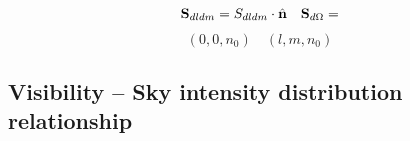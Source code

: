 \begin{equation}
{\bf S}_{dldm} = S_{dldm}\cdot\hat{\bf n} \quad {\bf S}_{d\Omega} = 
\end{equation}
\begin{equation}
(0,0,n_{0}) \quad (l,m,n_{0})
\end{equation}

\subsection{Visibility -- Sky intensity distribution relationship}
\label{sec:intVisInt}